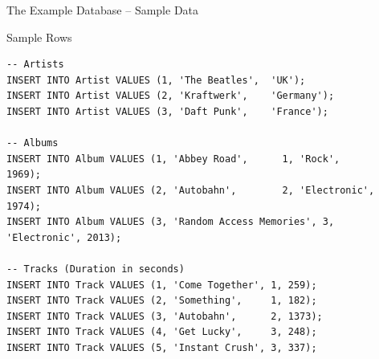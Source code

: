 \begin{frame}[fragile]{The Example Database -- Sample Data}
  \begin{block}{Sample Rows}
\begin{lstlisting}[style=sqlstyle]
-- Artists
INSERT INTO Artist VALUES (1, 'The Beatles',  'UK');
INSERT INTO Artist VALUES (2, 'Kraftwerk',    'Germany');
INSERT INTO Artist VALUES (3, 'Daft Punk',    'France');

-- Albums
INSERT INTO Album VALUES (1, 'Abbey Road',      1, 'Rock',        1969);
INSERT INTO Album VALUES (2, 'Autobahn',        2, 'Electronic',  1974);
INSERT INTO Album VALUES (3, 'Random Access Memories', 3, 'Electronic', 2013);

-- Tracks (Duration in seconds)
INSERT INTO Track VALUES (1, 'Come Together', 1, 259);
INSERT INTO Track VALUES (2, 'Something',     1, 182);
INSERT INTO Track VALUES (3, 'Autobahn',      2, 1373);
INSERT INTO Track VALUES (4, 'Get Lucky',     3, 248);
INSERT INTO Track VALUES (5, 'Instant Crush', 3, 337);
\end{lstlisting}
  \end{block}
\end{frame}
